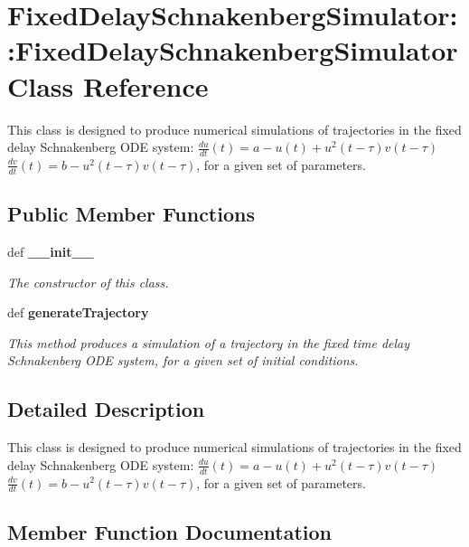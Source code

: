 \section{FixedDelaySchnakenbergSimulator::FixedDelaySchnakenbergSimulator Class Reference}
\label{class_fixed_delay_schnakenberg_simulator_1_1_fixed_delay_schnakenberg_simulator}


This class is designed to produce numerical simulations of trajectories in the fixed delay Schnakenberg ODE system: $ \frac{du}{dt}(t) = a - u(t) + u^2(t-\tau)v(t-\tau) $ $ \frac{dv}{dt}(t) = b - u^2(t-\tau)v(t-\tau) $, for a given set of parameters.  


\subsection*{Public Member Functions}
\begin{DoxyCompactItemize}
\item 
def {\bf \_\-\_\-init\_\-\_\-}
\begin{DoxyCompactList}\small\item\em The constructor of this class. \item\end{DoxyCompactList}\item 
def {\bf generateTrajectory}
\begin{DoxyCompactList}\small\item\em This method produces a simulation of a trajectory in the fixed time delay Schnakenberg ODE system, for a given set of initial conditions. \item\end{DoxyCompactList}\end{DoxyCompactItemize}


\subsection{Detailed Description}
This class is designed to produce numerical simulations of trajectories in the fixed delay Schnakenberg ODE system: $ \frac{du}{dt}(t) = a - u(t) + u^2(t-\tau)v(t-\tau) $ $ \frac{dv}{dt}(t) = b - u^2(t-\tau)v(t-\tau) $, for a given set of parameters. 

\subsection{Member Function Documentation}

